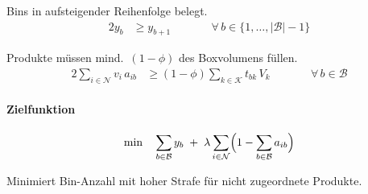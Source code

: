 \documentclass[10pt]{article}
\newcommand{\NN}{\mathcal{N}}
\newcommand{\R}{\mathcal{R}}
\newcommand{\BB}{\mathcal{B}}
\newcommand{\KK}{\mathcal{K}}
\begin{document}
Bins in aufsteigender Reihenfolge belegt.
\begin{alignat*}{2}
y_b &\geq y_{b+1}
  &\qquad& \forall\, b \in \{1, \dots, |\BB|-1\}
\end{alignat*}

Produkte m\"ussen mind.\ $(1 - \phi)$ des Boxvolumens f\"ullen.
\begin{alignat*}{2}
\sum_{i \in \NN} v_i\, a_{ib} &\geq (1 - \phi) \sum_{k \in \KK} t_{bk}\, V_k
  &\qquad& \forall\, b \in \BB
\end{alignat*}

\paragraph{Zielfunktion}

\begin{equation*}
\min \quad
  \sum_{b \in \BB} y_b
  \;+\;
  \lambda \sum_{i \in \NN} \Bigl(1 - \sum_{b \in \BB} a_{ib}\Bigr)
\end{equation*}

Minimiert Bin-Anzahl mit hoher Strafe f\"ur nicht zugeordnete Produkte.




\end{document}

